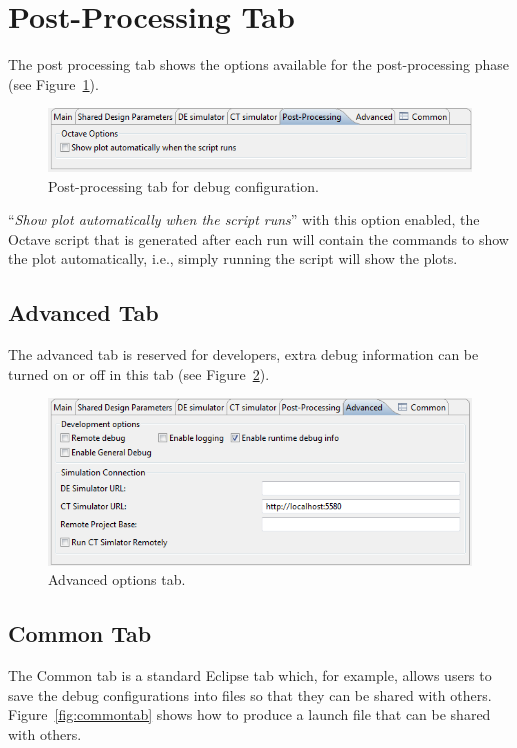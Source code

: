 \documentclass{crescendorepchap}
\begin{document}
\section{Post-Processing Tab}

The post processing tab shows the options available for the
post-processing phase (see Figure~\ref{fig:postproctab}).

\begin{figure}[htbp]
\centering
\includegraphics[width=.6\textwidth]{images/Postprocessingtab.png}
\caption{Post-processing tab for debug configuration.\label{fig:postproctab}}
\end{figure}

``\emph{Show plot automatically when the script runs}'' with this option
enabled, the Octave script that is generated after each run will
contain the commands to show the plot automatically, i.e., simply
running the script will show the plots.

\subsection{Advanced Tab}

The advanced tab is reserved for developers, extra debug information can
be turned on or off in this tab (see Figure~\ref{fig:advancedtab}). 

\begin{figure}[htbp]
\centering
\includegraphics[width=.6\textwidth]{images/Advancedoptionstab.png}
\caption{Advanced options tab.\label{fig:advancedtab}}
\end{figure}

\subsection{Common Tab}

The Common tab is a standard Eclipse tab which, for example, allows
users to save the debug configurations into files so that they can be
shared with others. Figure~\ref{fig:commontab} shows how to produce a launch file that can be shared with others.
\end{document}
